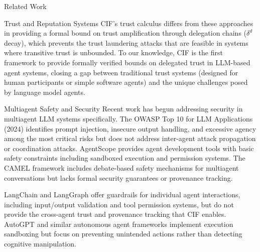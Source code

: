 \documentclass[
  ignorenonframetext,
]{beamer}
\begin{document}
\begin{frame}{Related Work}
\begin{block}{Trust and Reputation Systems}
CIF's trust calculus differs from these approaches in providing a formal
bound on trust amplification through delegation chains (\(\delta^d\)
decay), which prevents the trust laundering attacks that are feasible in
systems where transitive trust is unbounded. To our knowledge, CIF is
the first framework to provide formally verified bounds on delegated
trust in LLM-based agent systems, closing a gap between traditional
trust systems (designed for human participants or simple software
agents) and the unique challenges posed by language model agents.
\end{block}

\begin{block}{Multiagent Safety and Security}
\protect{}\label{multiagent-safety-and-security}
Recent work has begun addressing security in multiagent LLM systems
specifically. The OWASP Top 10 for LLM Applications (2024) identifies
prompt injection, insecure output handling, and excessive agency among
the most critical risks but does not address inter-agent attack
propagation or coordination attacks. AgentScope \cite{gao2024agentscope}
provides agent development tools with basic safety constraints including
sandboxed execution and permission systems. The CAMEL framework
\cite{li2023camel} includes debate-based safety mechanisms for
multiagent conversations but lacks formal security guarantees or
provenance tracking.

LangChain and LangGraph offer guardrails for individual agent
interactions, including input/output validation and tool permission
systems, but do not provide the cross-agent trust and provenance
tracking that CIF enables. AutoGPT and similar autonomous agent
frameworks implement execution sandboxing but focus on preventing
unintended actions rather than detecting cognitive manipulation.
\end{block}


\end{frame}
\end{document}
